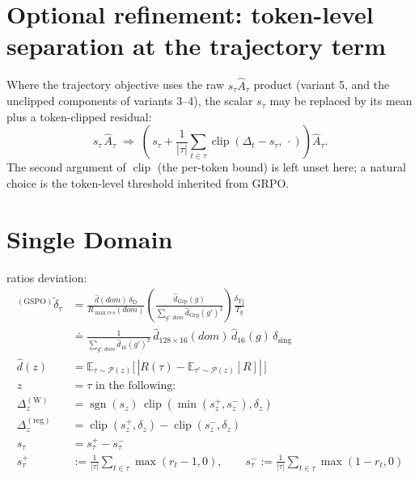 \documentclass{article}
\DeclareMathOperator*{\clip}{clip}
\begin{document}
\section{Optional refinement: token-level separation at the trajectory term}

Where the trajectory objective uses the raw $s_\tau\hat A_\tau$ product
(variant 5, and the unclipped components of variants 3--4), the scalar
$s_\tau$ may be replaced by its mean plus a token-clipped residual:
\[
  s_\tau\,\hat A_\tau
  \;\Longrightarrow\;
  \left(\,s_\tau + \frac{1}{|\tau|}\sum_{t\in\tau}\clip(\Delta_t - s_\tau,\,\cdot)\right)\hat A_\tau.
\]
The second argument of $\clip$ (the per-token bound) is left unset here; a
natural choice is the token-level threshold inherited from GRPO.

\section{Single Domain}

ratios deviation:
\begin{align*}
{}^{(\text{GSPO})}\tilde{\delta}_\tau 
&= \frac{\hat d(dom)\,\delta_{\text{D}}}{R_{\max res}(dom)}
   \left( \frac{\hat d_{\operatorname{Grp}}(g)}{\sum_{g':dom} \hat d_{\operatorname{Grp}}(g')^2} \right)
   \frac{\delta_{\operatorname{Tj}}}{T_g} \\
&\doteq \frac{1}{\sum_{g':dom} \hat d_{16}(g')^2}\,
   \hat d_{128\times 16}(dom)\,\hat d_{16}(g)\,\delta_{\operatorname{sing}} \\
\hat d(z) &= \mathbb{E}_{\tau \sim \mathcal{P}(z)}\bigl[\,|R(\tau) - \mathbb{E}_{\tau'\sim \mathcal{P}(z)}[R]|\,\bigr] \\
z &= \tau \text{ in the following:} \\
\Delta_z^{(\text{W})}   &= \operatorname{sgn}(s_z)\,\operatorname{clip}(\min(s_z^+, s_z^-), \delta_z) \\
\Delta_z^{(\text{reg})} &= \operatorname{clip}(s_z^+, \delta_z) - \operatorname{clip}(s_z^-, \delta_z) \\
s_\tau &= s_\tau^+ - s_\tau^- \\
s_\tau^+ &:= \frac{1}{|\tau|}\sum_{t\in\tau}\max(r_t - 1, 0), \qquad
s_\tau^- := \frac{1}{|\tau|}\sum_{t\in\tau}\max(1 - r_t, 0)
\end{align*}
\end{document}
